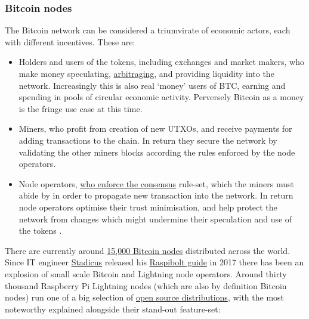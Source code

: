 \subsubsection{Bitcoin nodes }
The Bitcoin network can be considered a triumvirate of economic actors, each with different incentives. These are:
\begin{itemize}
\item Holders and users of the tokens, including exchanges and market makers, who make money speculating, \href{https://en.wikipedia.org/wiki/Arbitrage}{arbitraging}, and providing liquidity into the network. Increasingly this is also real `money' users of BTC, earning and spending in pools of circular economic activity. Perversely Bitcoin as a money is the fringe use case at this time.
\item Miners, who profit from creation of new UTXOs, and receive payments for adding transactions to the chain. In return they secure the network by validating the other miners blocks according the rules enforced by the node operators.
\item Node operators, \href{https://www.truthcoin.info/blog/measuring-decentralization/}{who enforce the consensus} rule-set, which the miners must abide by in order to propagate new transaction into the network. In return node operators optimise their trust minimisation, and help protect the network from changes which might undermine their speculation and use of the tokens \cite{blocksizewars}.
\end{itemize}
There are currently around \href{https://bitnodes.io/}{15,000 Bitcoin nodes} distributed across the world. 
Since IT engineer \href{https://stadicus.com/}{Stadicus} released his \href{https://raspibolt.org/backstory.html}{Raspibolt guide} in 2017 there has been an explosion of small scale Bitcoin and Lightning node operators. 
Around thirty thousand Raspberry Pi Lightning nodes (which are also by definition Bitcoin nodes) run one of a big selection of \href{https://github.com/bavarianledger/bitcoin-nodes}{open source distributions}, with the most noteworthy explained alongside their stand-out feature-set:
